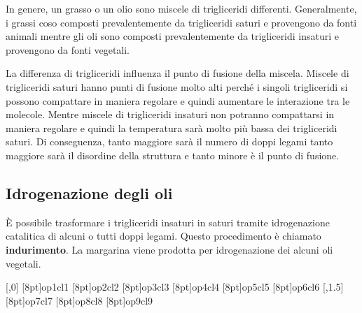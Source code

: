 In genere, un grasso o un olio sono miscele di trigliceridi differenti. Generalmente, i grassi coso composti prevalentemente da trigliceridi saturi e provengono da fonti animali mentre gli oli sono composti prevalentemente da trigliceridi insaturi e provengono da fonti vegetali.

La differenza di trigliceridi influenza il punto di fusione della miscela. Miscele di trigliceridi saturi hanno punti di fusione molto alti perché i singoli trigliceridi si possono compattare in maniera regolare e quindi aumentare le interazione tra le molecole. Mentre miscele di trigliceridi insaturi non potranno compattarsi in maniera regolare e quindi la temperatura sarà molto più bassa dei trigliceridi saturi. Di conseguenza, tanto maggiore sarà il numero di doppi legami tanto maggiore sarà il disordine della struttura e tanto minore è il punto di fusione.

\subsection{Idrogenazione degli oli}
È possibile trasformare i trigliceridi insaturi in saturi tramite idrogenazione catalitica di alcuni o tutti doppi legami. Questo procedimento è chiamato \textbf{indurimento}. La margarina viene prodotta per idrogenazione dei alcuni oli vegetali.
\chemnameinit{}
\begin{reaction}
	[,0]
	\makepolymerdelims[delimiters=(),subscript=$\scriptstyle \!3$]{2pt}[8pt]{op1}{cl1}
	\makepolymerdelims[delimiters=(),subscript=$\scriptstyle \!3$]{2pt}[8pt]{op2}{cl2}
	\makepolymerdelims[delimiters=(),subscript=$\scriptstyle \!3$]{2pt}[8pt]{op3}{cl3}
	\makepolymerdelims[delimiters=(),subscript=$\scriptstyle \!3$]{2pt}[8pt]{op4}{cl4}
	\makepolymerdelims[delimiters=(),subscript=$\scriptstyle \!3$]{2pt}[8pt]{op5}{cl5}
	\makepolymerdelims[delimiters=(),subscript=$\scriptstyle \!3$]{2pt}[8pt]{op6}{cl6}
	\arrow{->[3 \ch{H2}][cat. \ch{Ni}]}[,1.5]
	\makepolymerdelims[delimiters=(),subscript=$\scriptstyle \!8$]{2pt}[8pt]{op7}{cl7}
	\makepolymerdelims[delimiters=(),subscript=$\scriptstyle \!8$]{2pt}[8pt]{op8}{cl8}
	\makepolymerdelims[delimiters=(),subscript=$\scriptstyle \!8$]{2pt}[8pt]{op9}{cl9}
\end{reaction}
\chemnameinit{}

